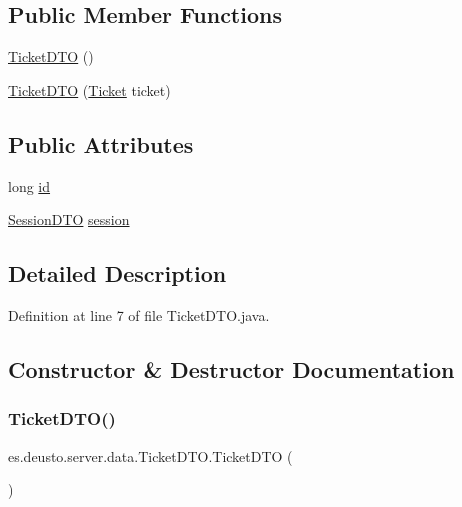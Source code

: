 \subsection*{Public Member Functions}
\begin{DoxyCompactItemize}
\item 
\mbox{\hyperlink{classes_1_1deusto_1_1server_1_1data_1_1_ticket_d_t_o_a3004b4770c42f61331b6eaab06ff096b}{Ticket\+D\+TO}} ()
\item 
\mbox{\hyperlink{classes_1_1deusto_1_1server_1_1data_1_1_ticket_d_t_o_ad3d32eef4ab6ad5ea98cc7aa35d3de50}{Ticket\+D\+TO}} (\mbox{\hyperlink{classes_1_1deusto_1_1server_1_1jdo_1_1_ticket}{Ticket}} ticket)
\end{DoxyCompactItemize}
\subsection*{Public Attributes}
\begin{DoxyCompactItemize}
\item 
long \mbox{\hyperlink{classes_1_1deusto_1_1server_1_1data_1_1_ticket_d_t_o_a1602514fbada31dc44edc01bf359c401}{id}}
\item 
\mbox{\hyperlink{classes_1_1deusto_1_1server_1_1data_1_1_session_d_t_o}{Session\+D\+TO}} \mbox{\hyperlink{classes_1_1deusto_1_1server_1_1data_1_1_ticket_d_t_o_a9d76a5dad7b29b3ea22f11df64f75483}{session}}
\end{DoxyCompactItemize}


\subsection{Detailed Description}


Definition at line 7 of file Ticket\+D\+T\+O.\+java.



\subsection{Constructor \& Destructor Documentation}
\mbox{\label{classes_1_1deusto_1_1server_1_1data_1_1_ticket_d_t_o_a3004b4770c42f61331b6eaab06ff096b}} 
\subsubsection{\texorpdfstring{TicketDTO()}{TicketDTO()}\hspace{0.1cm}{\footnotesize\ttfamily [1/2]}}
{\footnotesize\ttfamily es.\+deusto.\+server.\+data.\+Ticket\+D\+T\+O.\+Ticket\+D\+TO (\begin{DoxyParamCaption}{ }\end{DoxyParamCaption})}



